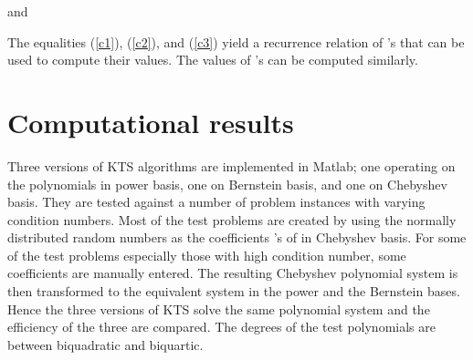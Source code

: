 \documentclass[12pt]{article}
\begin{document}
and

The equalities (\ref{c1}), (\ref{c2}), and (\ref{c3}) yield a
recurrence relation of 's that can be used to
compute their values.  The values of 's can be computed
similarly.

\section{Computational results}

Three versions of KTS algorithms are implemented in Matlab; one
operating on the polynomials in power basis, one on Bernstein
basis, and one on Chebyshev basis.  They are tested against a
number of problem instances with varying condition numbers.  Most
of the test problems are created by using the normally distributed
random numbers as the coefficients 's of  in Chebyshev
basis.  For some of the test problems especially those with high
condition number, some coefficients are manually entered.  The
resulting Chebyshev polynomial system is then transformed to the
equivalent system in the power and the Bernstein bases. Hence the
three versions of KTS solve the same polynomial system and the
efficiency of the three are compared. The degrees of the test
polynomials are between biquadratic and biquartic.
\end{document}
